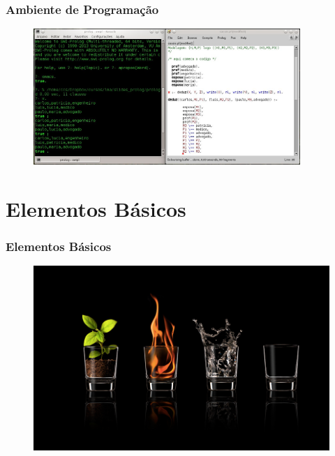 \documentclass[sans]{beamer}
\begin{document}

\begin{frame}[fragile]   %
\frametitle{Ambiente de Programação}
\begin{figure}[!htb]
\centering
\includegraphics[width=0.9\textwidth , height=0.7\textheight]{figuras/editor-emacs.jpeg}
\label{usandoProlog}
\end{figure}
\end{frame}



\section{Elementos Básicos}
\begin{frame}[fragile]   %
\frametitle{Elementos Básicos}

 
\begin{figure}[!htb]
\centering
\includegraphics[scale = 0.3]{figuras/elementos.png}
\label{fig_elementos}
\end{figure}
 

\end{frame}
\end{document}
